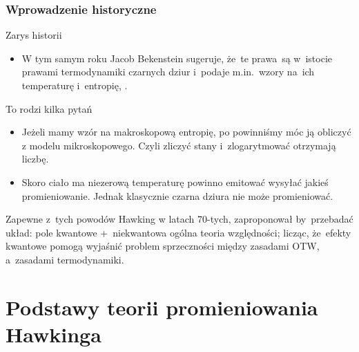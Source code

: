 \documentclass{beamer}  %
\begin{document}
\begin{frame}
  \frametitle{Wprowadzenie historyczne}


  \begin{block}{Zarys historii}
    \begin{itemize}
    \item W tym samym roku Jacob Bekenstein sugeruje, że~te prawa~są
      w~istocie prawami termodynamiki czarnych dziur i~podaje
      m.in.~wzory na~ich temperaturę i~entropię,
      \cite{BekensteinBlackHolesAndEntropy1973}.
    \end{itemize}
  \end{block}

  \begin{block}{To rodzi kilka pytań}
    \begin{itemize}
    \item Jeżeli mamy wzór na makroskopową entropię, po powinniśmy móc
      ją obliczyć z modelu mikroskopowego. Czyli zliczyć stany
      i~zlogarytmować otrzymają liczbę.
    \item Skoro ciało ma niezerową temperaturę powinno emitować
      wysyłać jakieś promieniowanie. Jednak klasycznie czarna dziura
      nie może promieniować.
    \end{itemize}
    Zapewne z~tych powodów Hawking w latach 70-tych, zaproponował
    by~przebadać układ: pole kwantowe +~niekwantowa ogólna teoria
    względności; licząc, że~efekty kwantowe pomogą wyjaśnić problem
    sprzeczności między zasadami OTW, a~zasadami termodynamiki.
  \end{block}

\end{frame}





\section[Podstawy teorii]{Podstawy teorii promieniowania Hawkinga}
\end{document}
